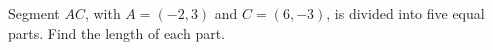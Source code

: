 Segment $AC$, with $A=(-2,3)$ and $C=(6,-3)$, is divided into five equal parts. Find the length of each part.
